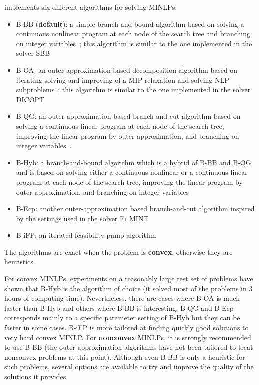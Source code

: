 \BONMIN implements six different algorithms for solving MINLPs:
\begin{itemize}
\setlength{\partopsep}{0pt}
\setlength{\itemsep}{0pt}
\item {B-BB} (\textbf{default}): a simple branch-and-bound algorithm based on solving a continuous nonlinear program at each node of the search tree and branching on integer variables~\cite{GuptaRavindran85}; this algorithm is similar to the one implemented in the solver \textsc{SBB}
\item {B-OA}: an outer-approximation based decomposition algorithm based on iterating solving and improving of a MIP relaxation and solving NLP subproblems~\cite{DuGr86,FlLe94}; this algorithm is similar to the one implemented in the solver \textsc{DICOPT}
\item {B-QG}: an outer-approximation based branch-and-cut algorithm based on solving a continuous linear program at each node of the search tree, improving the linear program by outer approximation, and branching on integer variables~\cite{QeGr92}.
\item {B-Hyb}: a branch-and-bound algorithm which is a hybrid of B-BB and B-QG and is based on solving either a continuous nonlinear or a continuous linear program at each node of the search tree, improving the linear program by outer approximation, and branching on integer variables~\cite{BBCCGLLLMSW}
\item {B-Ecp}: another outer-approximation based branch-and-cut algorithm inspired by the settings used in the solver \textsc{FilMINT}~\cite{AbLeLi07}
\item {B-iFP}: an iterated feasibility pump algorithm~\cite{BoCoLoMa06}
\end{itemize}
The algorithms are exact when the problem is \textbf{convex}, otherwise they are heuristics.

For convex MINLPs, experiments on a reasonably large test set of problems have shown that B-Hyb is the algorithm of choice (it solved most of the problems in 3 hours of computing time).
Nevertheless, there are cases where B-OA is much faster than B-Hyb and others where B-BB is interesting.
B-QG and B-Ecp corresponds mainly to a specific parameter setting of B-Hyb but they can be faster in some cases.
B-iFP is more tailored at finding quickly good solutions to very hard convex MINLP.
For \textbf{nonconvex} MINLPs, it is strongly recommended to use B-BB (the outer-approximation algorithms have not been tailored to treat nonconvex problems at this point).
Although even B-BB is only a heuristic for such problems, several options are available to try and improve the quality of the solutions it provides.


